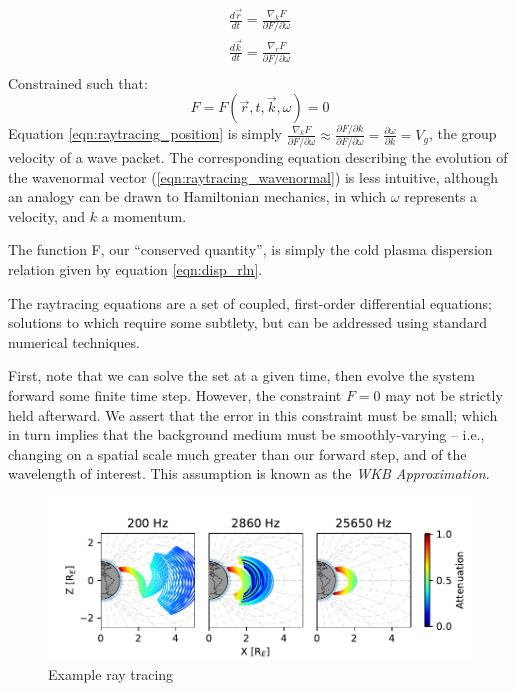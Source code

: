 \begin{eqnarray}
\frac{d\vec{r}}{dt} = \frac{\nabla_kF}{\partial F/\partial \omega} \label{eqn:raytracing_position}\\
\frac{d\vec{k}}{dt} = \frac{\nabla_rF}{\partial F/\partial \omega} \label{eqn:raytracing_wavenormal} \\
\end{eqnarray}
Constrained such that:
\begin{equation}
F = F(\vec{r},t,\vec{k},\omega) = 0
\end{equation}
Equation \ref{eqn:raytracing_position} is simply $\frac{\nabla_kF}{\partial F/\partial \omega} \approx\frac{\partial F/\partial k}{\partial F /\partial \omega} = \frac{\partial \omega}{\partial k} = V_g$, the group velocity of a wave packet. The corresponding equation describing the evolution of the wavenormal vector (\ref{eqn:raytracing_wavenormal}) is less intuitive, although an analogy can be drawn to Hamiltonian mechanics, in which $\omega$ represents a velocity, and $k$ a momentum.

The function F, our ``conserved quantity'', is simply the cold plasma dispersion relation given by equation \ref{eqn:disp_rln}.

The raytracing equations are a set of coupled, first-order differential equations; solutions to which require some subtlety, but can be addressed using standard numerical techniques.

First, note that we can solve the set at a given time, then evolve the system forward some finite time step. However, the constraint $F=0$ may not be strictly held afterward. We assert that the error in this constraint must be small; which in turn implies that the background medium must be smoothly-varying -- i.e., changing on a spatial scale much greater than our forward step, and of the wavelength of interest. This assumption is known as the \emph{WKB Approximation}.

\begin{figure}[ht]
\begin{center}
\includegraphics[draft]{Figures/raytracing_example.pdf}
\end{center}
\caption{Example ray tracing}
\end{figure}

